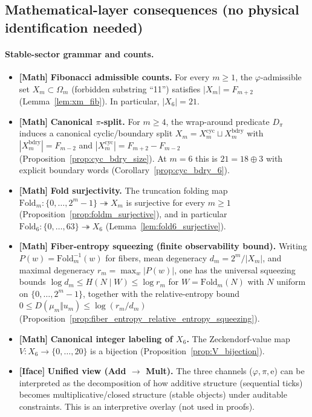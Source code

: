 \subsection{Mathematical-layer consequences (no physical identification needed)}
\paragraph{Stable-sector grammar and counts.}
\begin{itemize}
\item \textbf{[Math]} \textbf{Fibonacci admissible counts.}
For every $m\ge 1$, the $\varphi$-admissible set $X_m\subset\Omega_m$ (forbidden substring ``11'') satisfies $|X_m|=F_{m+2}$ (Lemma~\ref{lem:xm_fib}).
In particular, $|X_6|=21$.
\item \textbf{[Math]} \textbf{Canonical $\pi$-split.}
For $m\ge 4$, the wrap-around predicate $D_\pi$ induces a canonical cyclic/boundary split
$X_m=X_m^{\mathrm{cyc}}\sqcup X_m^{\mathrm{bdry}}$ with
$|X_m^{\mathrm{bdry}}|=F_{m-2}$ and $|X_m^{\mathrm{cyc}}|=F_{m+2}-F_{m-2}$
(Proposition~\ref{prop:cyc_bdry_size}).
At $m=6$ this is $21=18\oplus 3$ with explicit boundary words (Corollary~\ref{prop:cyc_bdry_6}).
\item \textbf{[Math]} \textbf{Fold surjectivity.}
The truncation folding map $\mathrm{Fold}_m:\{0,\dots,2^m-1\}\twoheadrightarrow X_m$ is surjective for every $m\ge 1$ (Proposition~\ref{prop:foldm_surjective}), and in particular $\mathrm{Fold}_6:\{0,\dots,63\}\twoheadrightarrow X_6$ (Lemma~\ref{lem:fold6_surjective}).
\item \textbf{[Math]} \textbf{Fiber-entropy squeezing (finite observability bound).}
Writing $P(w)=\mathrm{Fold}_m^{-1}(w)$ for fibers, mean degeneracy $d_m=2^m/|X_m|$, and maximal degeneracy $r_m=\max_w|P(w)|$, one has the universal squeezing bounds
$\log d_m\le H(N\mid W)\le \log r_m$ for $W=\mathrm{Fold}_m(N)$ with $N$ uniform on $\{0,\dots,2^m-1\}$, together with the relative-entropy bound
$0\le D(\mu_m\Vert u_m)\le \log(r_m/d_m)$ (Proposition~\ref{prop:fiber_entropy_relative_entropy_squeezing}).
\item \textbf{[Math]} \textbf{Canonical integer labeling of $X_6$.}
The Zeckendorf-value map $V:X_6\to\{0,\dots,20\}$ is a bijection (Proposition~\ref{prop:V_bijection}).
\item \textbf{[Iface]} \textbf{Unified view (Add $\to$ Mult).}
The three channels ($\varphi,\pi,\mathrm{e}$) can be interpreted as the decomposition of how additive structure (sequential ticks) becomes multiplicative/closed structure (stable objects) under auditable constraints. This is an interpretive overlay (not used in proofs).
\end{itemize}

